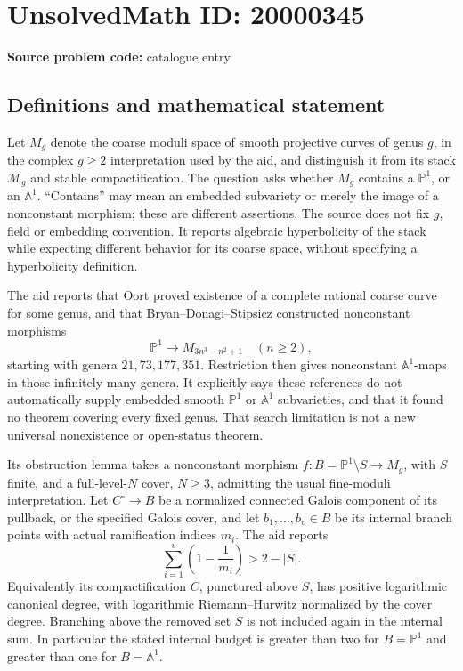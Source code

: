\documentclass[11pt]{article}
\newcommand{\A}{\mathbb{A}}
\newcommand{\PP}{\mathbb{P}}
\begin{document}
\section*{UnsolvedMath ID: 20000345}
\textbf{Source problem code:} catalogue entry
\subsection{Definitions and mathematical statement}
Let \(M_g\) denote the coarse moduli space of smooth projective curves of genus \(g\), in the complex \(g\geq2\) interpretation used by the aid, and distinguish it from its stack \(\mathcal M_g\) and stable compactification. The question asks whether \(M_g\) contains a \(\PP^1\), or an \(\A^1\). ``Contains'' may mean an embedded subvariety or merely the image of a nonconstant morphism; these are different assertions. The source does not fix \(g\), field or embedding convention. It reports algebraic hyperbolicity of the stack while expecting different behavior for its coarse space, without specifying a hyperbolicity definition.

The aid reports that Oort proved existence of a complete rational coarse curve for some genus, and that Bryan--Donagi--Stipsicz constructed nonconstant morphisms
\[
\PP^1\longrightarrow M_{3n^3-n^2+1}\quad(n\geq2),
\]
starting with genera \(21,73,177,351\). Restriction then gives nonconstant \(\A^1\)-maps in those infinitely many genera. It explicitly says these references do not automatically supply embedded smooth \(\PP^1\) or \(\A^1\) subvarieties, and that it found no theorem covering every fixed genus. That search limitation is not a new universal nonexistence or open-status theorem.

Its obstruction lemma takes a nonconstant morphism \(f:B=\PP^1\setminus S\to M_g\), with \(S\) finite, and a full-level-\(N\) cover, \(N\geq3\), admitting the usual fine-moduli interpretation. Let \(C^\circ\to B\) be a normalized connected Galois component of its pullback, or the specified Galois cover, and let \(b_1,\ldots,b_v\in B\) be its internal branch points with actual ramification indices \(m_i\). The aid reports
\[
\sum_{i=1}^v\left(1-\frac1{m_i}\right)>2-|S|.
\]
Equivalently its compactification \(C\), punctured above \(S\), has positive logarithmic canonical degree, with logarithmic Riemann--Hurwitz normalized by the cover degree. Branching above the removed set \(S\) is not included again in the internal sum. In particular the stated internal budget is greater than two for \(B=\PP^1\) and greater than one for \(B=\A^1\).
\end{document}
